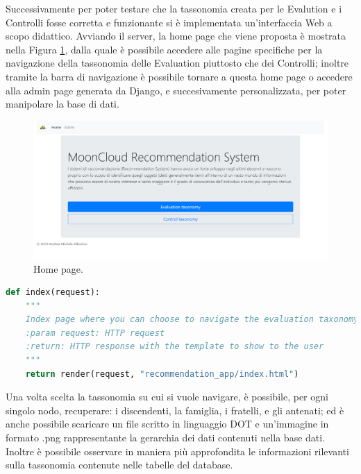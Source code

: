 %
\newpage
%
\hfill\break
Successivamente per poter testare che la tassonomia creata per le Evalution e i Controlli fosse corretta e funzionante si è 
implementata un'interfaccia Web a scopo didattico.
Avviando il server, la home page che viene proposta è mostrata nella Figura \ref{fig:MCRS_homepage}, dalla quale è possibile 
accedere alle pagine specifiche per la navigazione della tassonomia delle Evaluation piuttosto che dei Controlli; inoltre 
tramite la barra di navigazione è possibile tornare a questa home page o accedere alla admin page generata da Django, e 
succesivamente personalizzata, per poter manipolare la base di dati.
\begin{figure}[ht!]
    \includegraphics[scale=0.3]{images/MCRS_homepage.png}
    \caption{Home page.}
    \label{fig:MCRS_homepage}
\end{figure}
\lstset{style=python_code_style}
\begin{lstlisting}[language=Python, label=lst:view_homepage, caption={Parte principale del codice delle View della soluzione per gestire l'accesso 
    alla home page.}]
def index(request):
    """
    Index page where you can choose to navigate the evaluation taxonomy or the control taxonomy.
    :param request: HTTP request
    :return: HTTP response with the template to show to the user
    """
    return render(request, "recommendation_app/index.html")
\end{lstlisting}
%
Una volta scelta la tassonomia su cui si vuole navigare, è possibile, per ogni singolo nodo, recuperare: i 
discendenti, la famiglia, i fratelli, e gli antenati; ed è anche possibile scaricare un file scritto in linguaggio 
DOT e un'immagine in formato .png rappresentante la gerarchia dei dati contenuti nella base dati.
Inoltre è possibile osservare in maniera più approfondita le informazioni rilevanti sulla tassonomia contenute nelle tabelle 
del database.
